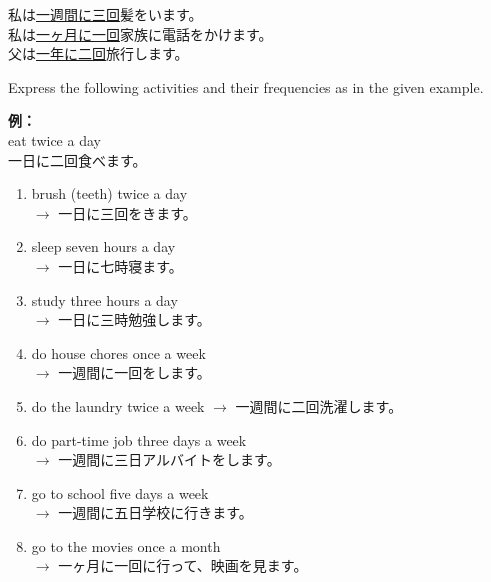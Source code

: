 \documentclass[notoc,notitlepage]{tufte-book}
\begin{document}
\begin{eg}
\noindent 私は\underline{一週間に三回}髪をいます。\\
\noindent 私は\underline{一ヶ月に一回}家族に電話をかけます。\\
\noindent 父は\underline{一年に二回}旅行します。
\end{eg}

\begin{ex}
  Express the following activities and their frequencies as in the given example.

  \textbf{例：} \\
  eat twice a day \\
  一日に二回食べます。

  \begin{enumerate}
    \item brush (teeth) twice a day \\
      $\to$ 一日に三回をきます。
    \item sleep seven hours a day \\
      $\to$ 一日に七時寝ます。
    \item study three hours a day \\
      $\to$ 一日に三時勉強します。
    \item do house chores once a week \\
      $\to$ 一週間に一回をします。
    \item do the laundry twice a week
      $\to$ 一週間に二回洗濯します。
    \item do part-time job three days a week \\
      $\to$ 一週間に三日アルバイトをします。
    \item go to school five days a week \\
      $\to$ 一週間に五日学校に行きます。
    \item go to the movies once a month \\
      $\to$ 一ヶ月に一回に行って、映画を見ます。
  \end{enumerate}
\end{ex}
\end{document}
